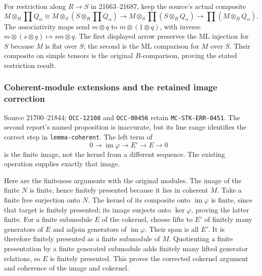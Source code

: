 For restriction along \(R\to S\) in 21663--21687, keep the source's actual composite \[
M\otimes_R\prod Q_\alpha
\cong M\otimes_S(S\otimes_R\prod Q_\alpha)
\longrightarrow M\otimes_S\prod(S\otimes_RQ_\alpha)
\longrightarrow\prod(M\otimes_RQ_\alpha).
\] The associativity maps send \(m\otimes q\) to \(m\otimes(1\otimes q)\), with inverse \(m\otimes(s\otimes q)\mapsto sm\otimes q\). The first displayed arrow preserves the ML injection for \(S\) because \(M\) is flat over \(S\); the second is the ML comparison for \(M\) over \(S\). Their composite on simple tensors is the original \(R\)-comparison, proving the stated restriction result.

\subsubsection{Coherent-module extensions and the retained image correction}\label{algebra-proof-013-coherent-module-extensions-and-the-retained-image-correction}

Source 21700--21844; \texttt{OCC-12108} and \texttt{OCC-00456} retain \texttt{MC-\AlgebraIdentifierBreak{}STK-\AlgebraIdentifierBreak{}ERR-\AlgebraIdentifierBreak{}0451}. The second report's named proposition is inaccurate, but its line range identifies the correct step in \texttt{lemma-\AlgebraIdentifierBreak{}coherent}. The left term of \[
0\longrightarrow\operatorname{im}\varphi\longrightarrow E'\longrightarrow E\longrightarrow0
\] is the finite image, not the kernel from a different sequence. The existing operation supplies exactly that image.

Here are the finiteness arguments with the original modules. The image of the finite \(N\) is finite, hence finitely presented because it lies in coherent \(M\). Take a finite free surjection onto \(N\). The kernel of its composite onto \(\operatorname{im}\varphi\) is finite, since that target is finitely presented; its image surjects onto \(\ker\varphi\), proving the latter finite. For a finite submodule \(E\) of the cokernel, choose lifts to \(E'\) of finitely many generators of \(E\) and adjoin generators of \(\operatorname{im}\varphi\). Their span is all \(E'\). It is therefore finitely presented as a finite submodule of \(M\). Quotienting a finite presentation by a finite generated submodule adds finitely many lifted generator relations, so \(E\) is finitely presented. This proves the corrected cokernel argument and coherence of the image and cokernel.

